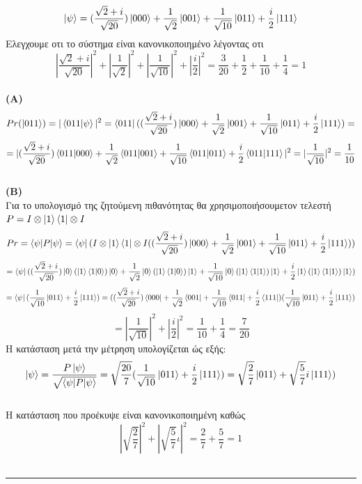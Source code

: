 \documentclass[12pt]{article}
\begin{document}
\section*{{}}
$$\ket{\psi} = (\frac{\sqrt{2}+i}{\sqrt{20}})\ket{000}+\frac{1}{\sqrt{2}}\ket{001} + \frac{1}{\sqrt{10}}\ket{011}+\frac{i}{2}\ket{111}$$
Ελεγχουμε οτι το σύστημα είναι κανονικοποιημένο λέγοντας οτι
$$ |\frac{\sqrt{2}+i}{\sqrt{20}}|^2+|\frac{1}{\sqrt{2}}|^2+|\frac{1}{\sqrt{10}}|^2+|\frac{i}{2}|^2 = \frac{3}{20}+\frac{1}{2}+\frac{1}{10}+\frac{1}{4}=1$$\\
{\bf { (\textlatin{A})}}
$$Pr(\ket{011})= |\braket{011|\psi}|^2=\bra{011}((\frac{\sqrt{2}+i}{\sqrt{20}})\ket{000}+\frac{1}{\sqrt{2}}\ket{001} + \frac{1}{\sqrt{10}}\ket{011}+\frac{i}{2}\ket{111})=$$
$$ =  |(\frac{\sqrt{2}+i}{\sqrt{20}})\braket{011|000}+\frac{1}{\sqrt{2}}\braket{011|001} + \frac{1}{\sqrt{10}}\braket{011|011}+\frac{i}{2}\braket{011|111}|^2=|\frac{1}{\sqrt{10}}|^2=\frac{1}{10}$$\\
{\bf { (\textlatin{B})}}\\
Για το υπολογισμό της ζητούμενη πιθανότητας θα χρησιμοποιήσουμετον τελεστή $ P= I\otimes\ket{1}\bra{1}\otimes I$
$$Pr = \braket{\psi|P|\psi} = \bra{\psi}(I\otimes\ket{1}\bra{1}\otimes I((\frac{\sqrt{2}+i}{\sqrt{20}})\ket{000}+\frac{1}{\sqrt{2}}\ket{001} + \frac{1}{\sqrt{10}}\ket{011}+\frac{i}{2}\ket{111}))$$
$$=\bra{\psi}((\frac{\sqrt{2}+i}{\sqrt{20}})\ket{0}(\ket{1}\braket{1|0})\ket{0}+\frac{1}{\sqrt{2}}\ket{0}(\ket{1}\braket{1|0})\ket{1} + \frac{1}{\sqrt{10}}\ket{0}(\ket{1}\braket{1|1})\ket{1}+\frac{i}{2}\ket{1}(\ket{1}\braket{1|1})\ket{1})$$
$$=\bra{\psi}(\frac{1}{\sqrt{10}}\ket{011}+\frac{i}{2}\ket{111})=((\frac{\sqrt{2}+i}{\sqrt{20}})\bra{000}+\frac{1}{\sqrt{2}}\bra{001} + \frac{1}{\sqrt{10}}\bra{011}+\frac{i}{2}\bra{111})(\frac{1}{\sqrt{10}}\ket{011}+\frac{i}{2}\ket{111})$$
$$=|\frac{1}{\sqrt{10}}|^2+|\frac{i}{2}|^2 = \frac{1}{10}+\frac{1}{4}=\frac{7}{20}$$
Η κατάσταση μετά την μέτρηση υπολογίζεται ώς εξής:
$$\ket{\psi} = \frac{P\ket{\psi}}{\sqrt{\braket{\psi|P|\psi}}} = \sqrt{\frac{20}{7}}(\frac{1}{\sqrt{10}}\ket{011}+\frac{i}{2}\ket{111})=\sqrt{\frac{2}{7}}\ket{011}+\sqrt{\frac{5}{7}}i\ket{111})$$\\
Η κατάσταση που προέκυψε είναι κανονικοποιημένη καθώς 
$$ |\sqrt{\frac{2}{7}}|^2 + |\sqrt{\frac{5}{7}}ι|^2 = \frac{2}{7} +\frac{5}{7}=1$$\\
\rule{\textwidth}{.5pt}
\end{document}
